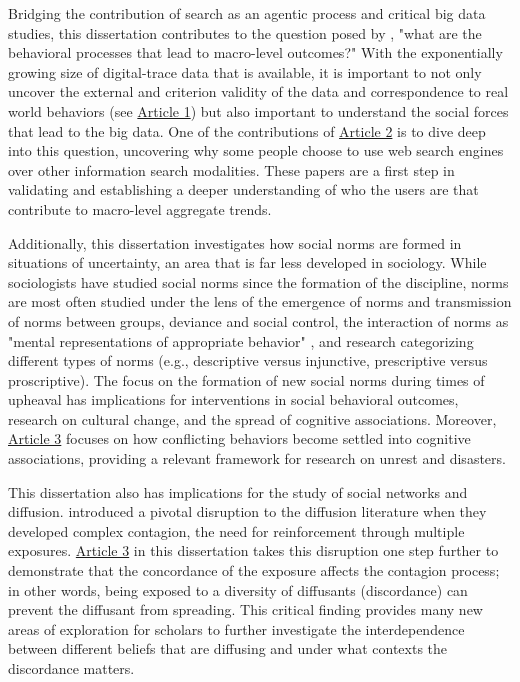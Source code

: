 Bridging the contribution of search as an agentic process 
and critical big data studies, this dissertation contributes to the question posed by 
\citet{breigerScaling2015}, "what are the behavioral processes that 
lead to macro-level outcomes?" With the exponentially growing size of digital-trace data
that is available, it is important to not only uncover the external and criterion validity of 
the data and correspondence to real world behaviors (see \hyperlink{paper-1}{Article 1})
but also important to understand the social forces that lead to the big data. 
One of the contributions of \hyperlink{paper-2}{Article 2} is to dive deep
into this question, uncovering why some people choose to use web search engines over other
information search modalities. These papers are a first step in validating and establishing
a deeper understanding of who the users are that contribute to macro-level aggregate trends. 

Additionally, this dissertation investigates how social norms are
formed in situations of uncertainty, an area that is far less developed in
sociology. While sociologists have studied social norms since the
formation of the discipline, norms are most often studied under the lens
of the emergence of norms and transmission of norms between groups, 
deviance and social control, the interaction of norms as "mental 
representations of appropriate behavior" \citep{aarts2003silence}, 
and research categorizing different types of norms (e.g., descriptive 
versus injunctive, prescriptive versus proscriptive).  
The focus on the formation of new social norms during times of upheaval 
has implications for interventions in social behavioral outcomes, 
research on cultural change, and the spread of cognitive associations. 
Moreover, \hyperlink{paper-3}{Article 3} focuses on how conflicting
behaviors become settled into cognitive associations, providing
a relevant framework for research on unrest and disasters.

This dissertation also has implications for the study of social
networks and diffusion. \citet{centolaComplexContagionsWeakness2007}
introduced a pivotal disruption to the diffusion literature when
they developed complex contagion, the need for reinforcement through multiple
exposures.  \hyperlink{paper-3}{Article 3} in this dissertation
takes this disruption one step further to demonstrate that the concordance
of the exposure affects the contagion process; in other words, being exposed to a 
diversity of diffusants (discordance) can prevent the diffusant from spreading. 
This critical finding provides many new areas of exploration for scholars 
to further investigate the interdependence between different beliefs that
are diffusing and under what contexts the discordance matters. 

